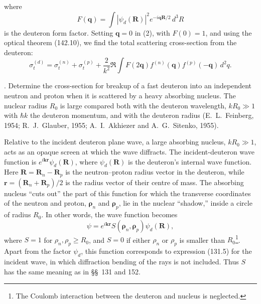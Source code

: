 \par\noindent where
\[
 F(\mathbf q)=\int|\psi_d(\mathbf R)|^2e^{-i\mathbf q\mathbf R/2}\,d^3R
\]
is the deuteron form factor. Setting $\mathbf q=0$ in (2), with $F(0)=1$, and using the optical theorem (142.10), we find the total scattering cross-section from the deuteron:
\begin{equation}
 \sigma_t^{(d)}=\sigma_t^{(n)}+\sigma_t^{(p)}+\frac2{k^2}\Re\int F(2\mathbf q)f^{(n)}(\mathbf q)f^{(p)}(-\mathbf q)\,d^2q.
 \tag{3}
\end{equation}

. Determine the cross-section for breakup of a fast deuteron into an independent neutron and proton when it is scattered by a heavy absorbing nucleus. The nuclear radius $R_0$ is large compared both with the deuteron wavelength, $kR_0\gg1$ with $\hbar k$ the deuteron momentum, and with the deuteron radius (E.~L.~Feinberg, 1954; R.~J.~Glauber, 1955; A.~I.~Akhiezer and A.~G.~Sitenko, 1955).

\SolutionHeading Relative to the incident deuteron plane wave, a large absorbing nucleus, $kR_0\gg1$, acts as an opaque screen at which the wave diffracts. The incident-deuteron wave function is $e^{i\mathbf k\mathbf r}\psi_d(\mathbf R)$, where $\psi_d(\mathbf R)$ is the deuteron's internal wave function. Here $\mathbf R=\mathbf R_n-\mathbf R_p$ is the neutron--proton radius vector in the deuteron, while $\mathbf r=(\mathbf R_n+\mathbf R_p)/2$ is the radius vector of their centre of mass. The absorbing nucleus ``cuts out'' the part of this function for which the transverse coordinates of the neutron and proton, $\boldsymbol\rho_n$ and $\boldsymbol\rho_p$, lie in the nuclear ``shadow,'' inside a circle of radius $R_0$. In other words, the wave function becomes
\[
 \psi=e^{i\mathbf k\mathbf r}S(\boldsymbol\rho_n,\boldsymbol\rho_p)\psi_d(\mathbf R),
\]
where $S=1$ for $\rho_n,\rho_p\geqslant R_0$, and $S=0$ if either $\rho_n$ or $\rho_p$ is smaller than $R_0$\footnote{The Coulomb interaction between the deuteron and nucleus is neglected.}. Apart from the factor $\psi_d$, this function corresponds to expression (131.5) for the incident wave, in which diffraction bending of the rays is not included. Thus $S$ has the same meaning as in \S\S~131 and 152.

